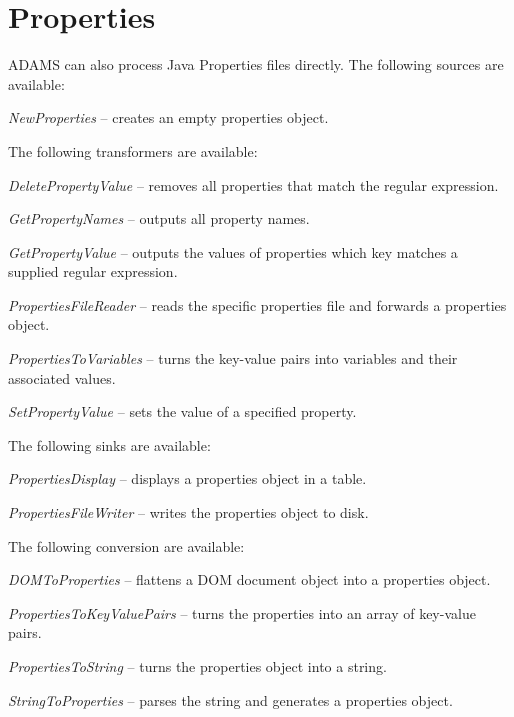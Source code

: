 \section{Properties}
\label{properties}
ADAMS can also process Java Properties files directly.
The following sources are available:
\begin{tight_itemize}
	\item \textit{NewProperties} -- creates an empty properties object.
\end{tight_itemize}
The following transformers are available:
\begin{tight_itemize}
	\item \textit{DeletePropertyValue} -- removes all properties that match the
	regular expression.
	\item \textit{GetPropertyNames} -- outputs all property names.
	\item \textit{GetPropertyValue} -- outputs the values of properties
	which key matches a supplied regular expression.
	\item \textit{PropertiesFileReader} -- reads the specific properties file
	and forwards a properties object.
	\item \textit{PropertiesToVariables} -- turns the key-value pairs into
	 variables and their associated values.
	\item \textit{SetPropertyValue} -- sets the value of a specified property.
\end{tight_itemize}
The following sinks are available:
\begin{tight_itemize}
	\item \textit{PropertiesDisplay} -- displays a properties object in a table.
	\item \textit{PropertiesFileWriter} -- writes the properties object to disk.
\end{tight_itemize}
The following conversion are available:
\begin{tight_itemize}
	\item \textit{DOMToProperties} -- flattens a DOM document object into a
	properties object.
	\item \textit{PropertiesToKeyValuePairs} -- turns the properties into an
	array of key-value pairs.
	\item \textit{PropertiesToString} -- turns the properties object into a string.
	\item \textit{StringToProperties} -- parses the string and generates a properties object.
\end{tight_itemize}


